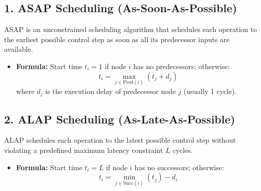 \documentclass[12pt,a4paper]{article}
\begin{document}
\subsection{1. ASAP Scheduling (As-Soon-As-Possible)}
ASAP is an unconstrained scheduling algorithm that schedules each operation to the earliest possible control step as soon as all its predecessor inputs are available.
\begin{itemize}[leftmargin=*, itemsep=2pt]
  \item \textbf{Formula:} Start time $t_i = 1$ if node $i$ has no predecessors; otherwise:
        \begin{equation}
          t_i = \max_{j \in \text{Pred}(i)} (t_j + d_j)
        \end{equation}
        where $d_j$ is the execution delay of predecessor node $j$ (usually 1 cycle).
\end{itemize}

\subsection{2. ALAP Scheduling (As-Late-As-Possible)}
ALAP schedules each operation to the latest possible control step without violating a predefined maximum latency constraint $L$ cycles.
\begin{itemize}[leftmargin=*, itemsep=2pt]
  \item \textbf{Formula:} Start time $t_i = L$ if node $i$ has no successors; otherwise:
        \begin{equation}
          t_i = \min_{j \in \text{Succ}(i)} (t_j) - d_i
        \end{equation}
\end{itemize}
\end{document}

